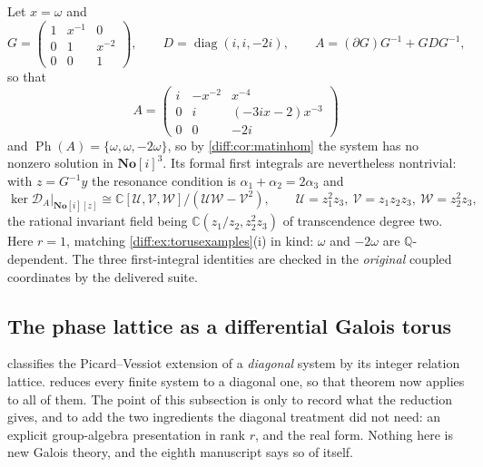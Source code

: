 \documentclass[11pt,letterpaper]{article}
\numberwithin{equation}{section}
\theoremstyle{definition}
\theoremstyle{remark}
\newcommand{\SC}{\mathbf{No}[i]}
\newcommand{\C}{\mathbb C}
\newcommand{\Q}{\mathbb Q}
\newcommand{\der}{\partial}
\newcommand{\Ker}{\operatorname{ker}}
\newcommand{\Ph}{\operatorname{Ph}}
\begin{document}
\begin{example}
\label{diff:ex:matthreephase}
Let $x=\omega$ and
\[
 G=\begin{pmatrix}1&x^{-1}&0\\0&1&x^{-2}\\0&0&1\end{pmatrix},
 \qquad
 D=\operatorname{diag}(i,i,-2i),
 \qquad
 A=(\der G)G^{-1}+GDG^{-1},
\]
so that
\begin{equation}\label{diff:eq:matthreematrix}
 A=\begin{pmatrix}
 i & -x^{-2} & x^{-4}\\
 0 & i & (-3ix-2)x^{-3}\\
 0 & 0 & -2i
 \end{pmatrix}
\end{equation}
and $\Ph(A)=\{\omega,\omega,-2\omega\}$, so by \cref{diff:cor:matinhom} the
system has no nonzero solution in $\SC^{3}$. Its formal first integrals are
nevertheless nontrivial: with $z=G^{-1}y$ the resonance condition is
$\alpha_{1}+\alpha_{2}=2\alpha_{3}$ and
\begin{equation}\label{diff:eq:mattoric}
 \Ker\mathcal D_{A}\big|_{\SC[z]}\cong\C[\mathcal U,\mathcal V,\mathcal W]
   /(\mathcal U\mathcal W-\mathcal V^{2}),
 \qquad
 \mathcal U=z_{1}^{2}z_{3},\ \mathcal V=z_{1}z_{2}z_{3},\
 \mathcal W=z_{2}^{2}z_{3},
\end{equation}
the rational invariant field being $\C(z_{1}/z_{2},z_{2}^{2}z_{3})$ of
transcendence degree two. Here $r=1$, matching
\cref{diff:ex:torusexamples}(i) in kind: $\omega$ and $-2\omega$ are
$\Q$-dependent. The three first-integral identities are checked in the
\emph{original} coupled coordinates by the delivered suite.
\end{example}

\subsection{The phase lattice as a differential Galois torus}
\label{diff:sub:mattorus}

 classifies the Picard--Vessiot extension of a
\emph{diagonal} system by its integer relation lattice.
 reduces every finite system to a diagonal one, so
that theorem now applies to all of them. The point of this subsection is only
to record what the reduction gives, and to add the two ingredients the
diagonal treatment did not need: an explicit group-algebra presentation in
rank $r$, and the real form. Nothing here is new Galois theory, and the eighth
manuscript says so of itself.
\end{document}
